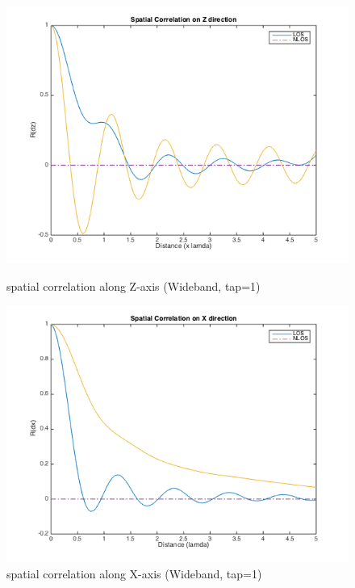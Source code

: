 \documentclass[a4paper]{article}
\begin{document}
    \begin{figure}[ht]
		\begin{minipage}[t]{0.5\linewidth}
			\centering
			\includegraphics[scale=0.4]{figures/wb_spc_Z.png}
			\vspace{-0.3cm}
			\centering
			\caption{spatial correlation along Z-axis (Wideband, tap=1)}
            \label{fig:wb_spc_z}
		\end{minipage}
		\begin{minipage}[t]{0.5\linewidth}
			\centering
			\includegraphics[scale=0.4]{figures/wb_spc_X.png}
			\vspace{-0.3cm}
			\centering
			\caption{spatial correlation along X-axis (Wideband, tap=1)}
            \label{fig:wb_spc_x}
		\end{minipage}
    \end{figure}
    
\end{document}
